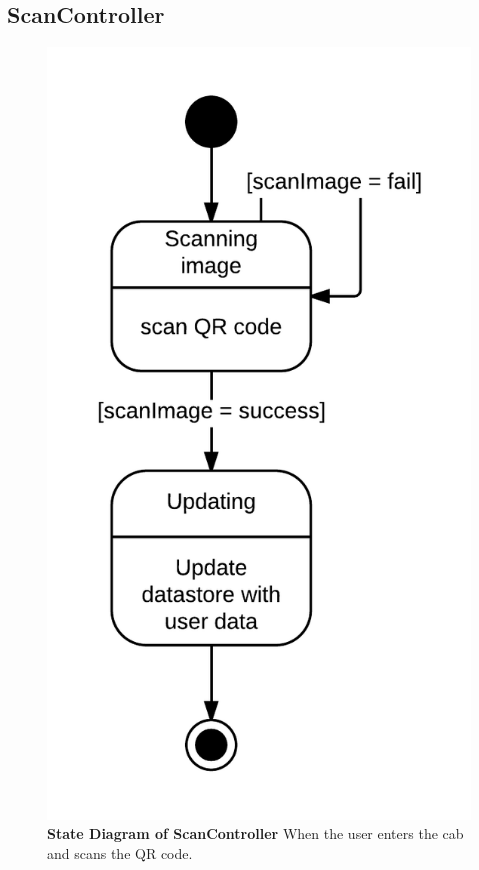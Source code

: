 \documentclass[]{article}
\begin{document}
\subsection{ScanController}

\begin{figure}[H]
\label{SCState}
	\centering
	\includegraphics[height=0.5\textheight]{ScanController.png}
	\caption{\textbf{State Diagram of ScanController} When the user enters the cab and scans the QR code.}
\end{figure}
\end{document}
